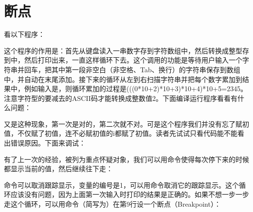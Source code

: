 


\section{断点}
%
看以下程序：





这个程序的作用是：首先从键盘读入一串数字存到字符数组中，然后转换成整型存到中，然后打印出来，一直这样循环下去。这个调用的功能是等待用户输入一个字符串并回车，把其中第一段非空白（非空格、Tab、换行）的字符串保存到数组中，并自动在末尾添加。接下来的循环从左到右扫描字符串并把每个数字累加到结果中，例如输入是\BookCode{\BookQuoteChar{}2345\BookQuoteChar{}}，则循环累加的过程是(((0*\BookSplit{}10+\BookSplit{}2)*10+\BookSplit{}3)*10+\BookSplit{}4)*10+\BookSplit{}5=\BookSplit{}2345。注意字符型的要减去的ASCII码才能转换成整数值2。下面编译运行程序看看有什么问题：




又是这种现象，第一次是对的，第二次就不对。可是这个程序我们并没有忘了赋初值，不仅赋了初值，连不必赋初值的i都赋了初值。读者先试试只看代码能不能看出错误原因。下面来调试：




有了上一次的经验，被列为重点怀疑对象，我们可以用命令使得每次停下来的时候都显示当前的值，然后继续往下走：




命令可以取消跟踪显示，变量的编号是1，可以用命令取消它的跟踪显示。这个循环应该没有问题，因为上面第一次输入时打印的结果是正确的。如果不想一步一步走这个循环，可以用命令（简写为）在第9行设一个断点（Breakpoint）：


